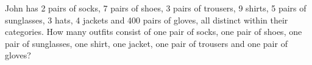 John has 2 pairs of socks, 7 pairs of shoes, 3 pairs of trousers, 9 shirts, 5 pairs of sunglasses, 3 hats, 4 jackets and 400 pairs of gloves, all distinct within their categories. How many outfits consist of one pair of socks, one pair of shoes, one pair of sunglasses, one shirt, one jacket, one pair of trousers and one pair of gloves?
